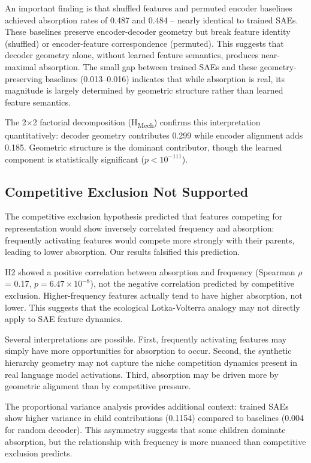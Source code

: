 \documentclass{article}
\begin{document}
An important finding is that shuffled features and permuted encoder baselines achieved absorption rates of 0.487 and 0.484 -- nearly identical to trained SAEs. These baselines preserve encoder-decoder geometry but break feature identity (shuffled) or encoder-feature correspondence (permuted). This suggests that decoder geometry alone, without learned feature semantics, produces near-maximal absorption. The small gap between trained SAEs and these geometry-preserving baselines (0.013--0.016) indicates that while absorption is real, its magnitude is largely determined by geometric structure rather than learned feature semantics.

The 2$\times$2 factorial decomposition (H\textsubscript{Mech}) confirms this interpretation quantitatively: decoder geometry contributes 0.299 while encoder alignment adds 0.185. Geometric structure is the dominant contributor, though the learned component is statistically significant ($p < 10^{-111}$).

\subsection{Competitive Exclusion Not Supported}

The competitive exclusion hypothesis predicted that features competing for representation would show inversely correlated frequency and absorption: frequently activating features would compete more strongly with their parents, leading to lower absorption. Our results falsified this prediction.

H2 showed a positive correlation between absorption and frequency (Spearman $\rho$ = 0.17, $p = 6.47 \times 10^{-8}$), not the negative correlation predicted by competitive exclusion. Higher-frequency features actually tend to have higher absorption, not lower. This suggests that the ecological Lotka-Volterra analogy may not directly apply to SAE feature dynamics.

Several interpretations are possible. First, frequently activating features may simply have more opportunities for absorption to occur. Second, the synthetic hierarchy geometry may not capture the niche competition dynamics present in real language model activations. Third, absorption may be driven more by geometric alignment than by competitive pressure.

The proportional variance analysis provides additional context: trained SAEs show higher variance in child contributions (0.1154) compared to baselines (0.004 for random decoder). This asymmetry suggests that some children dominate absorption, but the relationship with frequency is more nuanced than competitive exclusion predicts.
\end{document}
